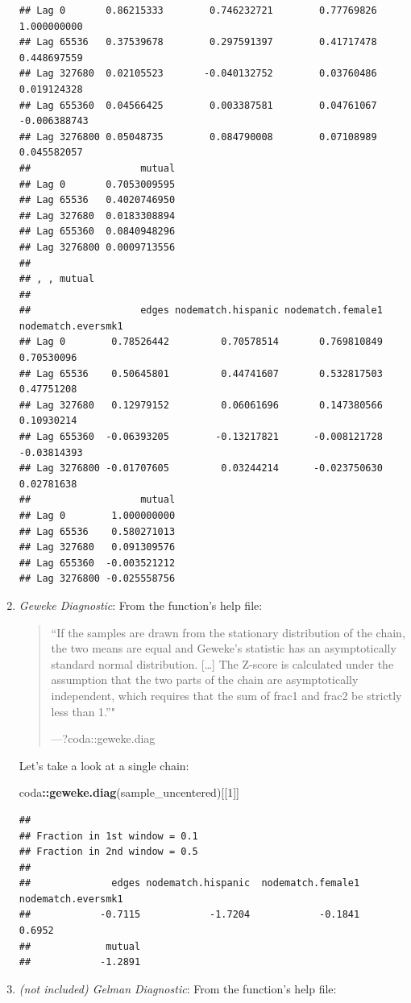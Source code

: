 \documentclass[]{book}
\newenvironment{Shaded}{\begin{snugshade}}{\end{snugshade}}
\newcommand{\DecValTok}[1]{\textcolor[rgb]{0.00,0.00,0.81}{#1}}
\newcommand{\KeywordTok}[1]{\textcolor[rgb]{0.13,0.29,0.53}{\textbf{#1}}}
\newcommand{\NormalTok}[1]{#1}
\newcommand{\OperatorTok}[1]{\textcolor[rgb]{0.81,0.36,0.00}{\textbf{#1}}}
\begin{document}
\begin{enumerate}
\begin{verbatim}
## Lag 0       0.86215333        0.746232721        0.77769826        1.000000000
## Lag 65536   0.37539678        0.297591397        0.41717478        0.448697559
## Lag 327680  0.02105523       -0.040132752        0.03760486        0.019124328
## Lag 655360  0.04566425        0.003387581        0.04761067       -0.006388743
## Lag 3276800 0.05048735        0.084790008        0.07108989        0.045582057
##                   mutual
## Lag 0       0.7053009595
## Lag 65536   0.4020746950
## Lag 327680  0.0183308894
## Lag 655360  0.0840948296
## Lag 3276800 0.0009713556
## 
## , , mutual
## 
##                   edges nodematch.hispanic nodematch.female1 nodematch.eversmk1
## Lag 0        0.78526442         0.70578514       0.769810849         0.70530096
## Lag 65536    0.50645801         0.44741607       0.532817503         0.47751208
## Lag 327680   0.12979152         0.06061696       0.147380566         0.10930214
## Lag 655360  -0.06393205        -0.13217821      -0.008121728        -0.03814393
## Lag 3276800 -0.01707605         0.03244214      -0.023750630         0.02781638
##                   mutual
## Lag 0        1.000000000
## Lag 65536    0.580271013
## Lag 327680   0.091309576
## Lag 655360  -0.003521212
## Lag 3276800 -0.025558756
\end{verbatim}
\item
  \emph{Geweke Diagnostic}: From the function's help file:

  \begin{quote}
  ``If the samples are drawn from the stationary distribution of the chain, the two means are equal and Geweke's statistic has an asymptotically standard normal distribution. {[}\ldots{}{]}
  The Z-score is calculated under the assumption that the two parts of the chain are asymptotically independent, which requires that the sum of frac1 and frac2 be strictly less than 1.''"

  ---?coda::geweke.diag
  \end{quote}

  Let's take a look at a single chain:

\begin{Shaded}
\begin{Highlighting}[]
\NormalTok{coda}\OperatorTok{::}\KeywordTok{geweke.diag}\NormalTok{(sample_uncentered)[[}\DecValTok{1}\NormalTok{]]}
\end{Highlighting}
\end{Shaded}

\begin{verbatim}
## 
## Fraction in 1st window = 0.1
## Fraction in 2nd window = 0.5 
## 
##              edges nodematch.hispanic  nodematch.female1 nodematch.eversmk1 
##            -0.7115            -1.7204            -0.1841             0.6952 
##             mutual 
##            -1.2891
\end{verbatim}
\item
  \emph{(not included) Gelman Diagnostic}: From the function's help file:


\end{enumerate}
\end{document}
